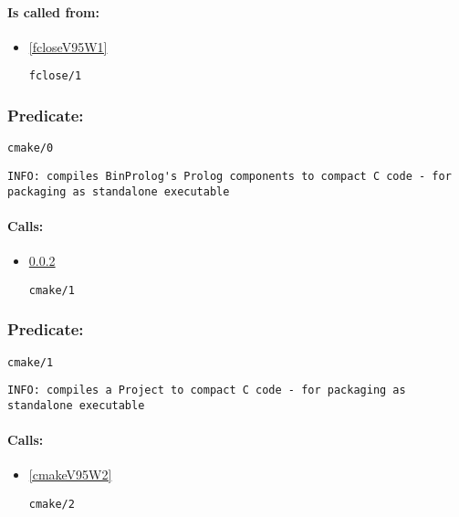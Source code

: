 \paragraph{Is called from:} 
\begin{itemize}
\item \ref{fcloseV95W1} 
\begin{verbatim}
fclose/1
\end{verbatim}

\end{itemize}

\subsubsection{Predicate:} \label{cmakeV95W0}

\begin{verbatim}
cmake/0
\end{verbatim}

{\small \begin{verbatim}
INFO: compiles BinProlog's Prolog components to compact C code - for packaging as standalone executable

\end{verbatim}}
\paragraph{Calls:} 
\begin{itemize}
\item \ref{cmakeV95W1} 
\begin{verbatim}
cmake/1
\end{verbatim}

\end{itemize}

\subsubsection{Predicate:} \label{cmakeV95W1}

\begin{verbatim}
cmake/1
\end{verbatim}

{\small \begin{verbatim}
INFO: compiles a Project to compact C code - for packaging as standalone executable

\end{verbatim}}
\paragraph{Calls:} 
\begin{itemize}
\item \ref{cmakeV95W2} 
\begin{verbatim}
cmake/2
\end{verbatim}

\end{itemize}
